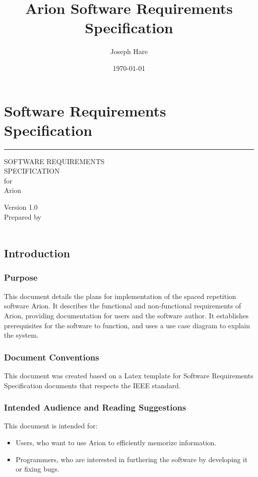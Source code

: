 \documentclass{scrreprt}
\title{Arion Software Requirements Specification}
\author{Joseph Hare}
\date{\today}
\makeatletter
\newcommand{\theauthor}{\@author}
\newcommand{\thedate}{\@date}
\newcommand{\version}{1.0 }
\newcommand{\bigspace}{\vspace{1.9cm}}
\newcommand{\smallspace}{\vspace{0.5cm}}
\makeatother
\begin{document}
\part{Software Requirements Specification}

\begin{flushright}
    \rule{\linewidth}{5pt}
    \vskip 1cm
    \begin{bfseries}
        \Huge
        SOFTWARE REQUIREMENTS\\
        SPECIFICATION\\
        \smallspace
        for\\
        \smallspace
        Arion\\
        \bigspace

        \LARGE
        Version \version \\
        \smallspace
        Prepared by \theauthor\\
        \smallspace
        \thedate\\
    \end{bfseries}
\end{flushright}

\tableofcontents


\chapter{Introduction}

\section{Purpose}
This document details the plans for implementation of the spaced repetition software Arion.
It describes the functional and non-functional requirements of Arion, providing documentation for users
and the software author.
It establishes prerequisites for the software to function, and uses a use case diagram to explain the system.

\section{Document Conventions}
This document was created based on a Latex template for Software Requirements Specification documents that
respects the IEEE standard.

\section{Intended Audience and Reading Suggestions}
This document is intended for:
\begin{itemize}
    \item Users, who want to use Arion to efficiently memorize information.
    \item Programmers, who are interested in furthering the software by developing it or
fixing bugs. 
\end{itemize}
\end{document}
